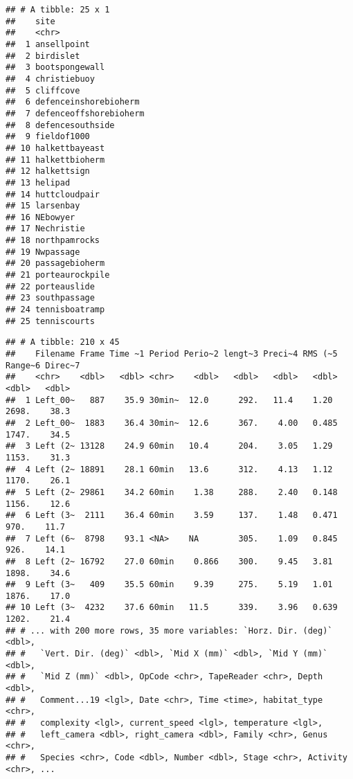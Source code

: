 \documentclass[
]{article}
\begin{document}
\begin{verbatim}
## # A tibble: 25 x 1
##    site                  
##    <chr>                 
##  1 ansellpoint           
##  2 birdislet             
##  3 bootspongewall        
##  4 christiebuoy          
##  5 cliffcove             
##  6 defenceinshorebioherm 
##  7 defenceoffshorebioherm
##  8 defencesouthside      
##  9 fieldof1000           
## 10 halkettbayeast        
## 11 halkettbioherm        
## 12 halkettsign           
## 13 helipad               
## 14 huttcloudpair         
## 15 larsenbay             
## 16 NEbowyer              
## 17 Nechristie            
## 18 northpamrocks         
## 19 Nwpassage             
## 20 passagebioherm        
## 21 porteaurockpile       
## 22 porteauslide          
## 23 southpassage          
## 24 tennisboatramp        
## 25 tenniscourts
\end{verbatim}

\begin{verbatim}
## # A tibble: 210 x 45
##    Filename Frame Time ~1 Period Perio~2 lengt~3 Preci~4 RMS (~5 Range~6 Direc~7
##    <chr>    <dbl>   <dbl> <chr>    <dbl>   <dbl>   <dbl>   <dbl>   <dbl>   <dbl>
##  1 Left_00~   887    35.9 30min~  12.0      292.   11.4    1.20    2698.    38.3
##  2 Left_00~  1883    36.4 30min~  12.6      367.    4.00   0.485   1747.    34.5
##  3 Left (2~ 13128    24.9 60min   10.4      204.    3.05   1.29    1153.    31.3
##  4 Left (2~ 18891    28.1 60min   13.6      312.    4.13   1.12    1170.    26.1
##  5 Left (2~ 29861    34.2 60min    1.38     288.    2.40   0.148   1156.    12.6
##  6 Left (3~  2111    36.4 60min    3.59     137.    1.48   0.471    970.    11.7
##  7 Left (6~  8798    93.1 <NA>    NA        305.    1.09   0.845    926.    14.1
##  8 Left (2~ 16792    27.0 60min    0.866    300.    9.45   3.81    1898.    34.6
##  9 Left (3~   409    35.5 60min    9.39     275.    5.19   1.01    1876.    17.0
## 10 Left (3~  4232    37.6 60min   11.5      339.    3.96   0.639   1202.    21.4
## # ... with 200 more rows, 35 more variables: `Horz. Dir. (deg)` <dbl>,
## #   `Vert. Dir. (deg)` <dbl>, `Mid X (mm)` <dbl>, `Mid Y (mm)` <dbl>,
## #   `Mid Z (mm)` <dbl>, OpCode <chr>, TapeReader <chr>, Depth <dbl>,
## #   Comment...19 <lgl>, Date <chr>, Time <time>, habitat_type <chr>,
## #   complexity <lgl>, current_speed <lgl>, temperature <lgl>,
## #   left_camera <dbl>, right_camera <dbl>, Family <chr>, Genus <chr>,
## #   Species <chr>, Code <dbl>, Number <dbl>, Stage <chr>, Activity <chr>, ...
\end{verbatim}
\end{document}

